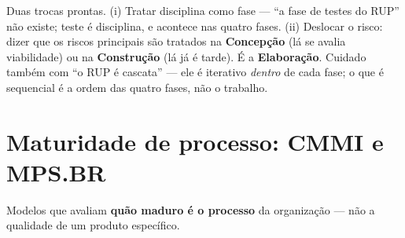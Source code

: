 \begin{pegadinha}
Duas trocas prontas. (i) Tratar disciplina como fase --- ``a fase de testes do
RUP'' não existe; teste é disciplina, e acontece nas quatro fases. (ii)
Deslocar o risco: dizer que os riscos principais são tratados na
\textbf{Concepção} (lá se avalia viabilidade) ou na \textbf{Construção} (lá já
é tarde). É a \textbf{Elaboração}. Cuidado também com ``o RUP é cascata'' ---
ele é iterativo \emph{dentro} de cada fase; o que é sequencial é a ordem das
quatro fases, não o trabalho.
\end{pegadinha}

\section{Maturidade de processo: CMMI e MPS.BR}

Modelos que avaliam \textbf{quão maduro é o processo} da organização --- não
a qualidade de um produto específico.

